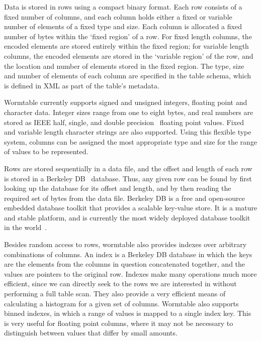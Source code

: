 \documentclass[10pt]{bmc_article}
\newenvironment{bmcformat}{\begin{raggedright}\baselineskip20pt\sloppy\setboolean{publ}{false}}{\end{raggedright}\baselineskip20pt\sloppy}
\begin{document}
\begin{bmcformat}
Data is stored in rows using a compact binary format.
Each row consists of a fixed number of columns, and each column 
holds either a fixed or variable number of elements of a fixed type and size.
Each column is allocated a fixed number of bytes within the `fixed region' of 
a row. For fixed
length columns, the encoded elements are stored entirely within the
fixed region; for variable length columns, the encoded elements are 
stored in the `variable region' of the row, and the location and number 
of elements stored in the fixed region. The type, size and number 
of elements of 
each column are specified in the table schema, which is defined 
in XML as part of the table's metadata.

Wormtable currently supports signed and unsigned integers, 
floating point and character data. Integer sizes range 
from one to eight bytes, and real numbers are stored as 
IEEE half, single, and double precision~\cite{ieee08}
floating point values.  
Fixed and variable length character strings 
are also supported. Using this flexible type system, columns can 
be assigned the most appropriate type and size for the range of
values to be represented.

Rows are stored sequentially in a data file, and the offset and length 
of each row is stored in a Berkeley DB~\cite{obs99} database. 
Thus, any given row can be found 
by first looking up the database for its offset and length, and by then reading
the required set of bytes from the data file. 
Berkeley DB is a free and open-source embedded database toolkit that provides a
scalable key-value store. It is a mature and stable platform, 
and is currently the most widely deployed database toolkit in the 
world~\cite{sb12}. 

Besides random access to rows, wormtable also provides indexes
over arbitrary combinations of columns. An index is a 
Berkeley DB database in 
which the keys are the elements from the columns in question concatenated
together, and the values are pointers to the original row. Indexes make
many operations much more efficient, since we can directly seek to the 
rows we are interested in without performing a full table scan. They also 
provide a very efficient means of calculating a histogram for a given 
set of columns. Wormtable also supports binned indexes, in which a range of 
values is mapped to a single index key. This is very useful for floating 
point columns, where it may not be necessary to distinguish between
values that differ by small amounts.


\end{bmcformat}
\end{document}
